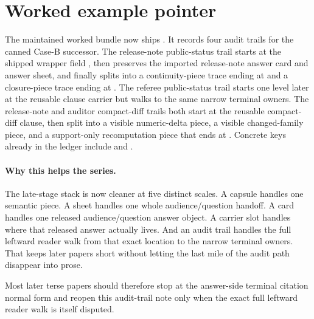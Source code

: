 \documentclass[11pt]{article}
\begin{document}
\section{Worked example pointer}
The maintained worked bundle now ships .\cite{series:workedexample}
It records four audit trails for the canned Case-B successor.
The release-note public-status trail starts at the shipped wrapper field , then preserves the imported release-note answer card and answer sheet, and finally splits into a continuity-piece trace ending at  and a closure-piece trace ending at .
The referee public-status trail starts one level later at the reusable clause carrier but walks to the same narrow terminal owners.
The release-note and auditor compact-diff trails both start at the reusable compact-diff clause, then split into a visible numeric-delta piece, a visible changed-family piece, and a support-only recomputation piece that ends at .
Concrete keys already in the ledger include  and .

\paragraph{Why this helps the series.}
The late-stage stack is now cleaner at five distinct scales.
A capsule handles one semantic piece.
A sheet handles one whole audience/question handoff.
A card handles one released audience/question answer object.
A carrier slot handles where that released answer actually lives.
And an audit trail handles the full leftward reader walk from that exact location to the narrow terminal owners.
That keeps later papers short without letting the last mile of the audit path disappear into prose.

Most later terse papers should therefore stop at the answer-side terminal citation normal form and reopen this audit-trail note only when the exact full leftward reader walk is itself disputed.\cite{series:challengeanswerreviewmenus,series:pairedterminalcitationdiscipline,series:pairedterminalcutoverrules}
\end{document}
